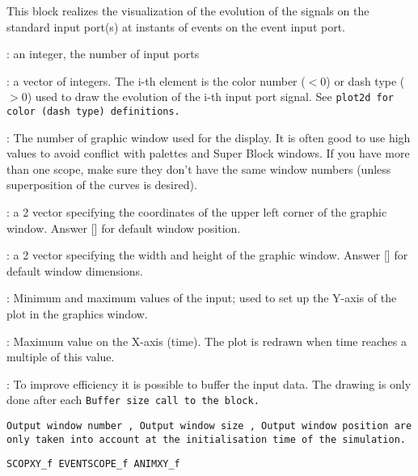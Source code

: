 This block realizes the visualization of the evolution of the signals
on the standard input port(s) at instants of events on the event
input port.
\begin{scitem}
\item[{\verb?Number of inputs?}]
: an integer, the number of input ports
\item[{\verb?Curve colors?}]
: a vector of integers. The i-th element is the color number ($<$0)
or dash type ($>$0) used to draw the evolution of the i-th 
input port signal. See %
\tt plot2d %
\rm for color (dash type) definitions.
\item[{\verb?Output window number?}]
: The number of graphic window used for the display. It is often good
to use high values to avoid conflict with palettes and Super Block
windows. If you have more than one scope, make sure they don't have
the same window numbers (unless superposition of the curves is
desired).
\item[{\verb?Output window position?}]
: a 2 vector specifying the coordinates of the upper left corner of
the graphic window. Answer [] for default window position.
\item[{\verb?Output window size?}]
: a 2 vector specifying the width and height  of 
the graphic window. Answer [] for default window dimensions.
\item[{\verb?Ymin, Ymax?}]
: Minimum and maximum values of the input; used to set up the Y-axis
of the plot in the graphics window.
\item[{\verb?Refresh period?}]
: Maximum value on the X-axis (time). The plot is redrawn when time
reaches a multiple of this value.
\item[{\verb?Buffer size?}]
: To improve efficiency it is possible to buffer the input data. The
drawing is only done after each %
\tt Buffer size %
\rm call to the block.
\end{scitem}%
%
\tt Output window number%
\rm , %
\tt Output window size%
\rm , %
\tt Output window
position %
\rm are only taken into account at the initialisation time of the
simulation. 

{\verb?SCOPXY_f EVENTSCOPE_f ANIMXY_f?} \pageref{SCOPXYfEVENTSCOPEfANIMXYf}




%
%


\label{SCOPXYf}

